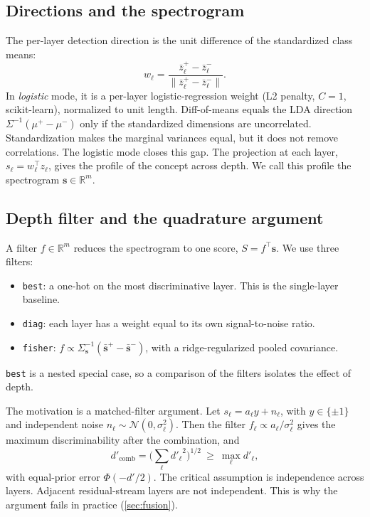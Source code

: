 \documentclass[11pt]{article}
\begin{document}
\subsection{Directions and the spectrogram}
The per-layer detection direction is the unit difference of the standardized class means:
\begin{equation}
w_\ell = \frac{\bar z^+_\ell - \bar z^-_\ell}{\lVert \bar z^+_\ell - \bar z^-_\ell\rVert}.
\end{equation}
In \emph{logistic} mode, it is a per-layer logistic-regression weight (L2 penalty, $C=1$, scikit-learn),
normalized to unit length. Diff-of-means equals the LDA
direction $\Sigma^{-1}(\mu^+-\mu^-)$ only if the standardized dimensions are uncorrelated. Standardization
makes the marginal variances equal, but it does not remove correlations. The logistic mode closes this
gap. The projection at each layer, $s_\ell = w_\ell^\top z_\ell$, gives the profile of the concept across
depth. We call this profile the spectrogram $\mathbf{s}\in\mathbb{R}^m$.

\subsection{Depth filter and the quadrature argument}
\label{sec:quadrature}
A filter $f\in\mathbb{R}^m$ reduces the spectrogram to one score, $S=f^\top\mathbf{s}$. We use three
filters:
\begin{itemize}[leftmargin=*]
  \item \texttt{best}: a one-hot on the most discriminative layer. This is the single-layer baseline.
  \item \texttt{diag}: each layer has a weight equal to its own signal-to-noise ratio.
  \item \texttt{fisher}: $f\propto\Sigma_{\mathbf{s}}^{-1}(\bar{\mathbf{s}}^+-\bar{\mathbf{s}}^-)$, with a
    ridge-regularized pooled covariance.
\end{itemize}
\texttt{best} is a nested special case, so a comparison of the filters isolates the effect of depth.

The motivation is a matched-filter argument. Let $s_\ell = a_\ell y + n_\ell$, with $y\in\{\pm1\}$ and
independent noise $n_\ell\sim\mathcal{N}(0,\sigma_\ell^2)$. Then the filter $f_\ell\propto
a_\ell/\sigma_\ell^2$ gives the maximum discriminability after the combination, and
\begin{equation}
d'_{\text{comb}} = \Big(\sum_\ell {d'_\ell}^2\Big)^{1/2} \ \ge\ \max_\ell d'_\ell ,
\end{equation}
with equal-prior error $\Phi(-d'/2)$. The critical assumption is independence across layers. Adjacent
residual-stream layers are not independent. This is why the argument fails in practice (\cref{sec:fusion}).
\end{document}
